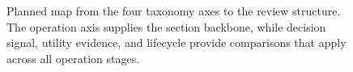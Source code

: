 \begin{figure}[t]
\centering
\fbox{\rule{0pt}{6.0cm}\rule{0.96\textwidth}{0pt}}
\caption{Planned map from the four taxonomy axes to the review structure. The operation axis supplies the section backbone, while decision signal, utility evidence, and lifecycle provide comparisons that apply across all operation stages.}
\label{fig:taxonomy-section-map}
\end{figure}

